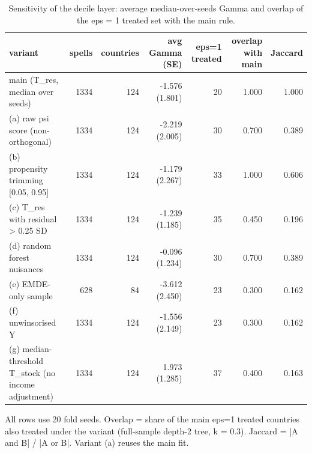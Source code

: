 \begin{table}[htbp]
\centering
\caption{Sensitivity of the decile layer: average median-over-seeds Gamma and overlap of the eps = 1 treated set with the main rule.}
\label{tab:sensitivity}
\begin{tabular}{lrrrrrr}
\toprule
variant & spells & countries & avg Gamma (SE) & eps=1 treated & overlap with main & Jaccard \\
\midrule
main (T\_res, median over seeds) & 1334 & 124 & -1.576 (1.801) & 20 & 1.000 & 1.000 \\
(a) raw psi score (non-orthogonal) & 1334 & 124 & -2.219 (2.005) & 30 & 0.700 & 0.389 \\
(b) propensity trimming [0.05, 0.95] & 1334 & 124 & -1.179 (2.267) & 33 & 1.000 & 0.606 \\
(c) T\_res with residual > 0.25 SD & 1334 & 124 & -1.239 (1.185) & 35 & 0.450 & 0.196 \\
(d) random forest nuisances & 1334 & 124 & -0.096 (1.234) & 30 & 0.700 & 0.389 \\
(e) EMDE-only sample & 628 & 84 & -3.612 (2.450) & 23 & 0.300 & 0.162 \\
(f) unwinsorised Y & 1334 & 124 & -1.556 (2.149) & 23 & 0.300 & 0.162 \\
(g) median-threshold T\_stock (no income adjustment) & 1334 & 124 & 1.973 (1.285) & 37 & 0.400 & 0.163 \\
\bottomrule
\end{tabular}
\par\smallskip\footnotesize All rows use 20 fold seeds. Overlap = share of the main eps=1 treated countries also treated under the variant (full-sample depth-2 tree, k = 0.3). Jaccard = |A and B| / |A or B|. Variant (a) reuses the main fit.
\end{table}
